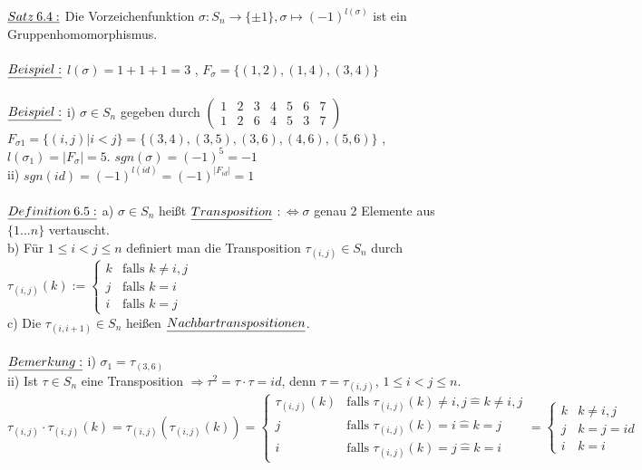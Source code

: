 \documentclass[fleqn, a4paper, 11pt]{article}
\begin{document}
\\
$\uline{Satz\:6.4:}$ Die Vorzeichenfunktion $\sigma:S_n\rightarrow\{\pm 1\},\sigma\mapsto (-1)^{l(\sigma)}$ ist ein Gruppenhomomorphismus.\\
\\
$\uline{Beispiel:}$ $l(\sigma)=1+1+1=3$ , $F_\sigma=\{(1,2),(1,4),(3,4)\}$\\
\\
$\uline{Beispiel:}$ i) $\sigma\in S_n$ gegeben durch $\begin{pmatrix}
	1 & 2 & 3 & 4 & 5 & 6 & 7\\
	1 & 2 & 6 & 4 & 5 & 3 & 7
\end{pmatrix}$ $F_{\sigma 1}=\{(i,j)|i<j\}=\{(3,4),(3,5),(3,6),(4,6),(5,6)\}$ , $l(\sigma_1)=|F_\sigma |=5$. $sgn(\sigma)=(-1)^5=-1$\\
ii) $sgn(id)=(-1)^{l(id)}=(-1)^{|F_{id}|}=1$\\
\\
$\uline{Definition\:6.5:}$ a) $\sigma\in S_n$ hei\ss{}t $\uline{Transposition}$ $:\Leftrightarrow \sigma$ genau 2 Elemente aus $\{1...n\}$ vertauscht.\\
b) F\"ur $1\leq i<j\leq n$ definiert man die Transposition $\tau_{(i,j)}\in S_n$ durch $\tau_{(i,j)}(k):=\begin{cases}
	k & \text{falls }k\neq i,j\\
	j & \text{falls }k=i\\
	i & \text{falls }k=j
\end{cases}$\\
c) Die $\tau_{(i,i+1)}\in S_n$ hei\ss{}en $\uline{Nachbartranspositionen}$.\\
\\
$\uline{Bemerkung:}$ i) $\sigma_1=\tau_{(3,6)}$\\
ii) Ist $\tau\in S_n$ eine Transposition $\Rightarrow \tau^2=\tau\cdot\tau=id$, denn $\tau=\tau_{(i,j)}$, $1\leq i<j\leq n$. \\
$\tau_{(i,j)}\cdot\tau_{(i,j)}(k)=\tau_{(i,j)}(\tau_{(i,j)}(k))=\begin{cases}
	\tau_{(i,j)}(k) & \text{falls }\tau_{(i,j)}(k)\neq i,j\widehat{=} k\neq i,j\\
	j & \text{falls } \tau_{(i,j)}(k)=i\widehat{=} k=j\\
	i & \text{falls } \tau_{(i,j)}(k)=j\widehat{=}k=i
\end{cases}=\begin{cases}
	k & k\neq i,j\\
	j & k=j=id\\
	i & k=i
\end{cases}$\\
\end{document}
